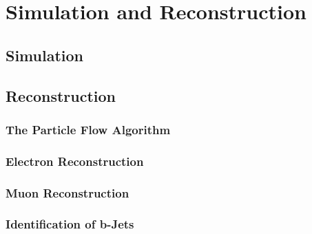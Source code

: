 
\chapter{Simulation and Reconstruction}

\section{Simulation}

\section{Reconstruction}

\subsection{The Particle Flow Algorithm}

\subsection{Electron Reconstruction}

\subsection{Muon Reconstruction}

\subsection{Identification of b-Jets}

